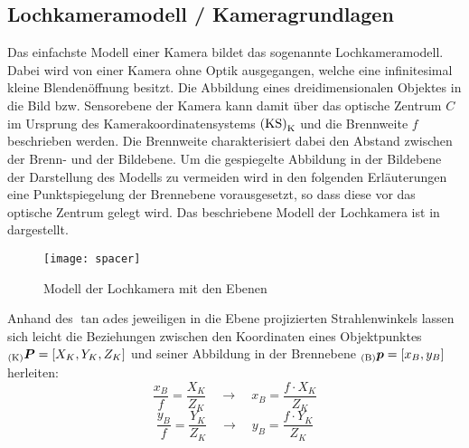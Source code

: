 \subsection{Lochkameramodell / Kameragrundlagen}
Das einfachste Modell einer Kamera bildet das sogenannte Lochkameramodell. Dabei wird von einer Kamera ohne Optik ausgegangen, welche eine infinitesimal kleine Blendenöffnung besitzt. Die Abbildung eines dreidimensionalen Objektes in die Bild bzw. Sensorebene der Kamera kann damit über das optische Zentrum $C$ im Ursprung des Kamerakoordinatensystems ${\mathrm{(KS)}}_{\mathrm{K}}$ und die Brennweite $f$ beschrieben werden. Die Brennweite charakterisiert dabei den Abstand zwischen der Brenn- und der Bildebene. Um die gespiegelte Abbildung in der Bildebene der Darstellung des Modells zu vermeiden wird in den folgenden Erläuterungen eine Punktspiegelung der Brennebene vorausgesetzt, so dass diese vor das optische Zentrum gelegt wird. Das beschriebene Modell der Lochkamera ist in  dargestellt.\\

\begin{figure}[ht]
	\begin{center}
		\texttt{[image: spacer]}
		\caption{Modell der Lochkamera mit den Ebenen}
		\label{fig.pinhole}
	\end{center}
\end{figure}

Anhand des $\tan{\alpha}$\red[alpha?] des jeweiligen in die Ebene projizierten Strahlenwinkels lassen sich leicht die Beziehungen zwischen den Koordinaten eines Objektpunktes ${_{{\mathrm{(K)}}}}\mbox{\boldmath{$P$}} = [X_K, Y_K, Z_K]$ und seiner Abbildung in der Brennebene ${_{{\mathrm{(B)}}}}\mbox{\boldmath{$p$}} = [x_B, y_B]$ herleiten:
\begin{equation}
\frac{x_B}{f}=\frac{X_K}{Z_K} \quad \rightarrow \quad x_B = \frac{f\cdot X_K}{Z_K}
\label{eq.xf}
\end{equation}
\begin{equation}
\frac{y_B}{f}=\frac{Y_K}{Z_K} \quad \rightarrow \quad y_B = \frac{f\cdot Y_K}{Z_K}
\label{eq.yf}
\end{equation}

